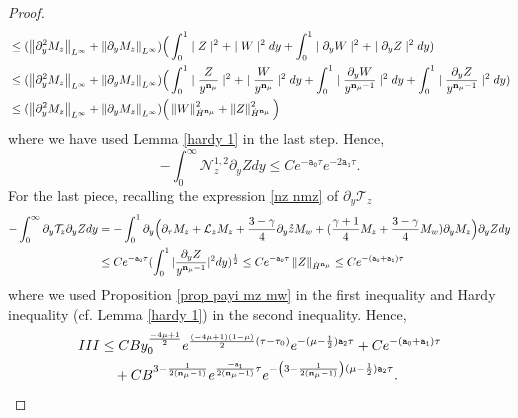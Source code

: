 \documentclass{article}
\newcommand{\norm}[1]{\left\lVert#1\right\rVert}
\newcommand{\ga}{\gamma}
\newcommand{\pa}{\partial}
\def\beqa{\begin{equation}\begin{aligned}}
\def\eeqa{\end{aligned}\end{equation}}
\def\espz{Z}
\def\espw{W}
\def\mz{M_z}
\def\mw{M_w}
\def\lz{\mathcal L_z}
\def\nz{\mathcal N_z}
\def\nmz{\mathcal T_z}
\def\epone{\mathtt{a_1}}
\def\eptwo{\mathtt{a_2}}
\def\epzero{\mathtt{a_0}}
\def\ndmu{{\bf{n}_{\mu}}}
\numberwithin{equation}{section}
\begin{document}
\begin{proof}
\begin{align*}
			&\leq (\norm{\pa_y^2\mz}_{L^\infty}+\norm{\pa_y\mz}_{L^\infty})\Big( \int_0^{1} \mid \espz\mid^2+ \mid \espw\mid^2 dy + \int_0^{1}  \mid \pa_y\espw\mid^2 +  \mid \pa_y\espz\mid^2 dy)\\
			&\leq (\norm{\pa_y^2\mz}_{L^\infty}+\norm{\pa_y\mz}_{L^\infty}) %
            \Big( \int_0^{1}  \mid \frac{\espz}{y^\ndmu}\mid^2+ \mid \frac{\espw}{y^\ndmu}\mid^2  dy + \int_0^{1}  \mid \frac{\pa_y\espw}{y^{\ndmu-1}}\mid^2 dy+\int_0^{1}  \mid \frac{\pa_y\espz}{y^{\ndmu-1}}\mid^2 dy)\\
			&\leq (\norm{\pa_y^2\mz}_{L^\infty}+\norm{\pa_y\mz}_{L^\infty}) %
            \Big( \norm{\espw}_{\dot H^\ndmu}^2+\norm{\espz}_{\dot H^\ndmu}^2\Big)
		 \end{align*}
		 where we have used %
         Lemma \ref{hardy 1} in the last step. Hence,
		 $$
		 	- \int_0^\infty \nz^{1,2} \pa_y \espz dy %
            \leq C e^{-\epzero \tau}e^{-2\epone \tau}.
		 $$
		 For the last piece, recalling the expression \eqref{nz nmz} of $\pa_y\nmz$ 
		 \begin{align*}
		 	- \int_0^\infty   \pa_y\nmz \pa_y Z  dy &= - \int_0^1\pa_y\Big(\pa_\tau \mz+  \lz \mz+\frac{3-\ga}{4}\partial_y \mathring z \mw +(\frac{\ga+1}{4}\mz+\frac{3-\ga}{4}\mw)\partial_y\mz\Big) \pa_y Z  dy \\
			&\leq C e^{-\epzero \tau} (\int_0^{1} |\frac{\pa_y Z}{y^{\ndmu-1}}|^2 dy)^\frac12 \le  C e^{-\epzero \tau} \norm{\espz}_{\dot H^\ndmu}  
			\leq  C e^{-(\epzero+ \epone )\tau}  
		 \end{align*}
	where we used Proposition \ref{prop payi mz mw} in the first inequality and Hardy inequality (cf. Lemma \ref{hardy 1}) 
    in the second inequality. Hence,  
	\beqa\label{III}
	 III&\leq CB y_0^{\frac{-4\mu +1}{2}} 
            e^{\frac{(-4\mu+1)(1-\mu)}{2}(\tau-\tau_0)}e^{-(\mu-\frac12)\eptwo\tau}+ C e^{-(\epzero+\epone) \tau}\\ %
            &\quad + C B^{3-\frac{1}{2(\ndmu-1)}} e^{\frac{-\epone}{2(\ndmu-1)}\tau} e^{-\left(3-\frac{1}{2(\ndmu-1)}\right)(\mu-\frac12)\eptwo \tau}.
	\eeqa
		 

\end{proof}
\end{document}
